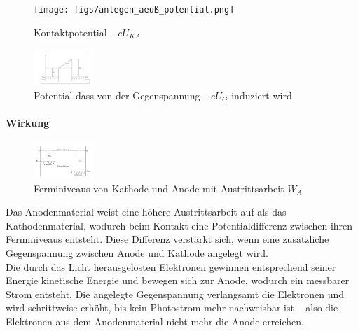 \documentclass[ngerman]{scrartcl}
\begin{document}
\begin{figure}[htbp]
    \centering
    \texttt{[image: figs/anlegen\_aeuß\_potential.png]}
    \caption{ Kontaktpotential $−eU_{KA}$ \cite{praktikum}}
    \label{fig:potential ext}
\end{figure}
\FloatBarrier

\begin{figure}[htbp]
    \centering
    \includegraphics[width=0.2\textwidth]{figs/kontaktpotential_kurzgeschl_elektroden.png}
    \caption{  Potential dass von der Gegenspannung
$−eU_G$ induziert wird\cite{praktikum}}
    \label{fig:potential kurzg.}
\end{figure}
\FloatBarrier

\paragraph{Wirkung}
\begin{figure}[htbp]
    \centering
    \includegraphics[width=0.2\textwidth]{figs/baenderschema_kathode_anode.png}
    \caption{ Ferminiveaus von Kathode und Anode mit Austrittsarbeit $W_A$ \cite{praktikum}}
    \label{fig:kathode-anode}
\end{figure}
\FloatBarrier
Das Anodenmaterial weist eine höhere Austrittsarbeit auf als das Kathodenmaterial, wodurch beim Kontakt eine Potentialdifferenz zwischen ihren Ferminiveaus entsteht. Diese Differenz verstärkt sich, wenn eine zusätzliche Gegenspannung zwischen Anode und Kathode angelegt wird.\\
Die durch das Licht herausgelösten Elektronen gewinnen entsprechend seiner Energie kinetische Energie und bewegen sich zur Anode, wodurch ein messbarer Strom entsteht. Die angelegte Gegenspannung verlangsamt die Elektronen und wird schrittweise erhöht, bis kein Photostrom mehr nachweisbar ist – also die Elektronen aus dem Anodenmaterial nicht mehr die Anode erreichen.
\end{document}
